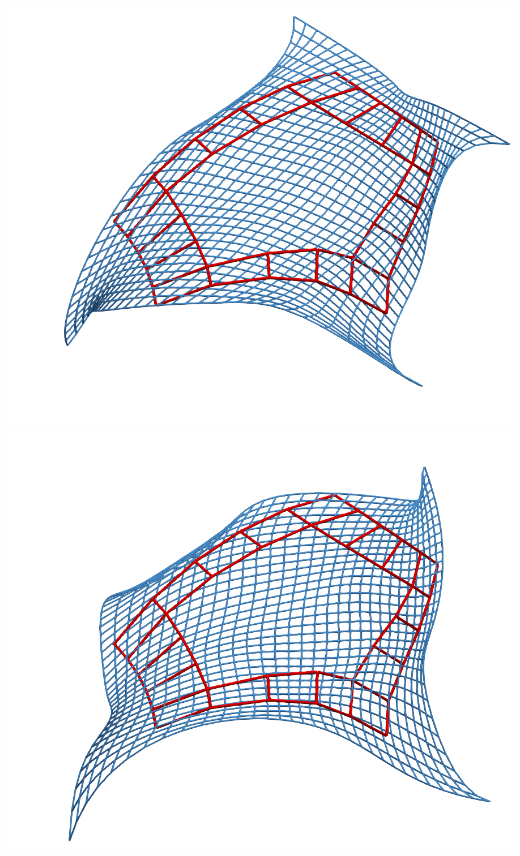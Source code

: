 \documentclass[xcolor=table]{beamer}
\begin{document}
\begin{frame}
  \includegraphics[width=.32\textwidth]{images/rotations/75-optimal.png}
  \includegraphics[width=.32\textwidth]{images/rotations/20.png}
\end{frame}
\end{document}

